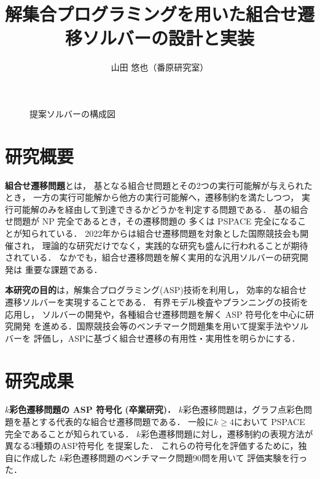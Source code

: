 \documentclass[a4j,10pt,dvipdfmx]{jarticle}
\title{解集合プログラミングを用いた組合せ遷移ソルバーの設計と実装}
\author{山田 悠也（番原研究室）}
\date{}
\newcommand{\code}[1]{\lstinline[basicstyle=\ttfamily]{#1}}
\begin{document}
\maketitle
\thispagestyle{empty}

\begin{figure}[H]
  \centering
  
  \caption{提案ソルバーの構成図}
  \label{fig:bcr}
\end{figure}

\begin{multicols}{1}

\section{研究概要}
\textbf{組合せ遷移問題}とは，
基となる組合せ問題とその2つの実行可能解が与えられたとき，
一方の実行可能解から他方の実行可能解へ，遷移制約を満たしつつ，
実行可能解のみを経由して到達できるかどうかを判定する問題である．
基の組合せ問題が NP 完全であるとき，その遷移問題の
多くは PSPACE 完全になることが知られている．
2022年からは組合せ遷移問題を対象とした国際競技会も開催され，
理論的な研究だけでなく，実践的な研究も盛んに行われることが期待されている．
なかでも，組合せ遷移問題を解く実用的な汎用ソルバーの研究開発は
重要な課題である．

%
%

\textbf{本研究の目的}は，解集合プログラミング(ASP)技術を利用し，
効率的な組合せ遷移ソルバーを実現することである．
有界モデル検査やプランニングの技術を応用し，
ソルバーの開発や，各種組合せ遷移問題を解く ASP 符号化を中心に研究開発
を進める．国際競技会等のベンチマーク問題集を用いて提案手法やソルバーを
評価し，ASPに基づく組合せ遷移の有用性・実用性を明らかにする．

\section{研究成果}
\textbf{$k$彩色遷移問題の ASP 符号化 (卒業研究)．}
$k$彩色遷移問題は，グラフ点彩色問題を基とする代表的な組合せ遷移問題である．
一般に$k \ge 4$において PSPACE 完全であることが知られている．
$k$彩色遷移問題に対し，遷移制約の表現方法が異なる3種類のASP符号化
を提案した．
これらの符号化を評価するために，独自に作成した
$k$彩色遷移問題のベンチマーク問題90問を用いて
評価実験を行った．


\end{multicols}
\end{document}
